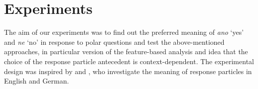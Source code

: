 \documentclass[output=paper,colorlinks,citecolor=brown]{langscibook}
\begin{document}




\section{Experiments} \label{hrdsim:sec:experiment}
The aim of our experiments was to find out the preferred meaning of \textit{ano} `yes' and \textit{ne} `no' in response to polar questions and test the above-mentioned approaches, in particular  version of the feature-based analysis and  idea that the choice of the response particle an\-te\-ced\-ent is context-dependent. The experimental design was inspired by \citet{kramer2012ellipsis} and \citet{claus2017puzzling}, who investigate the meaning of response particles in English and German.
\end{document}
